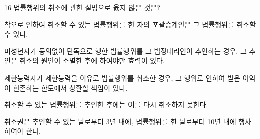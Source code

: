 \begin{question}{16}
법률행위의 취소에 관한 설명으로 옳지 않은 것은?
\begin{choices}
  \item 착오로 인하여 취소할 수 있는 법률행위를 한 자의 포괄승계인은 그 법률행위를 취소할 수 있다.
  \item 미성년자가 동의없이 단독으로 행한 법률행위를 그 법정대리인이 추인하는 경우, 그 추인은 취소의 원인이 소멸한 후에 하여야만 효력이 있다.
  \item 제한능력자가 제한능력을 이유로 법률행위를 취소한 경우, 그 행위로 인하여 받은 이익이 현존하는 한도에서 상환할 책임이 있다.
  \item 취소할 수 있는 법률행위를 추인한 후에는 이를 다시 취소하지 못한다.
  \item 취소권은 추인할 수 있는 날로부터 3년 내에, 법률행위를 한 날로부터 10년 내에 행사하여야 한다.
\end{choices}
\end{question}
